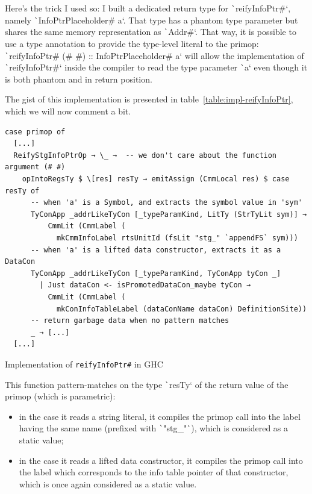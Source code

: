 \documentclass[english]{jflart}
\begin{document}
Here's the trick I used so: I built a dedicated return type for \texttt`reifyInfoPtr#`, namely \texttt`InfoPtrPlaceholder# a`. That type has a phantom type parameter but shares the same memory representation as \texttt`Addr#`. That way, it is possible to use a type annotation to provide the type-level literal to the primop: \texttt`reifyInfoPtr# (# #) :: InfoPtrPlaceholder# a` will allow the implementation of \texttt`reifyInfoPtr#` inside the compiler to read the type parameter \texttt`a` even though it is both phantom and in return position.

The gist of this implementation is presented in table~\ref{table:impl-reifyInfoPtr}, which we will now comment a bit.

\begin{table}[t]
\small
\begin{verbatim}
case primop of
  [...]
  ReifyStgInfoPtrOp → \_ →  -- we don't care about the function argument (# #)
    opIntoRegsTy $ \[res] resTy → emitAssign (CmmLocal res) $ case resTy of
      -- when 'a' is a Symbol, and extracts the symbol value in 'sym'
      TyConApp _addrLikeTyCon [_typeParamKind, LitTy (StrTyLit sym)] →
          CmmLit (CmmLabel (
            mkCmmInfoLabel rtsUnitId (fsLit "stg_" `appendFS` sym)))
      -- when 'a' is a lifted data constructor, extracts it as a DataCon
      TyConApp _addrLikeTyCon [_typeParamKind, TyConApp tyCon _]
        | Just dataCon <- isPromotedDataCon_maybe tyCon →
          CmmLit (CmmLabel (
            mkConInfoTableLabel (dataConName dataCon) DefinitionSite))
      -- return garbage data when no pattern matches
      _ → [...]
  [...]
\end{verbatim}
\caption{Implementation of \texttt{reifyInfoPtr\#} in GHC}
\label{table:impl-reifyInfoPtr}
\end{table}

This function pattern-matches on the type \texttt`resTy` of the return value of the primop (which is parametric):
\begin{itemize}
  \item in the case it reads a string literal, it compiles the primop call into the label having the same name (prefixed with \texttt`"stg_"`), which is considered as a static value;
  \item in the case it reads a lifted data constructor, it compiles the primop call into the label which corresponds to the info table pointer of that constructor, which is once again considered as a static value.
\end{itemize}
\end{document}
